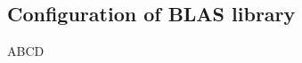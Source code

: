 \subsection{Configuration of BLAS library}

\begin{frame}[t]{ABCD}
    \small
    \justifying
    \space
\end{frame}